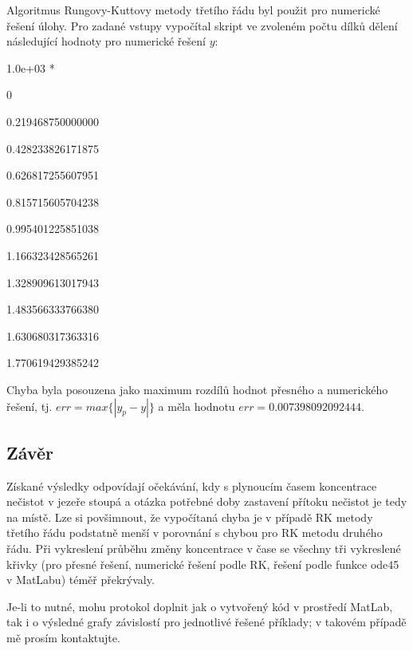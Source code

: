\documentclass[a4paper,12pt]{article}
\begin{document}
   Algoritmus Rungovy-Kuttovy metody třetího řádu byl použit pro numerické řešení úlohy. Pro zadané vstupy vypočítal skript ve zvoleném počtu dílků dělení následující hodnoty pro numerické řešení $y$:\bigskip
   
   1.0e+03 *\par

                   0\par
   0.219468750000000\par
   0.428233826171875\par
   0.626817255607951\par
   0.815715605704238\par
   0.995401225851038\par
   1.166323428565261\par
   1.328909613017943\par
   1.483566333766380\par
   1.630680317363316\par
   1.770619429385242\par
   
    Chyba byla posouzena jako maximum rozdílů hodnot přesného a numerického řešení, tj. $err=max\{\left|y_p-y\right|\}$ a měla hodnotu $err=0.007398092092444$.
    
    \subsection*{Závěr}
    Získané výsledky odpovídají očekávání, kdy s plynoucím časem koncentrace nečistot v jezeře stoupá a otázka potřebné doby zastavení přítoku nečistot je tedy na místě. Lze si povšimnout, že vypočítaná chyba je v případě RK metody třetího řádu podstatně menší v porovnání s chybou pro RK metodu druhého řádu. Při vykreslení průběhu změny koncentrace v čase se všechny tři vykreslené křivky (pro přesné řešení, numerické řešení podle RK, řešení podle funkce ode45 v MatLabu) téměř překrývaly.\par
Je-li to nutné, mohu protokol doplnit jak o vytvořený kód v prostředí MatLab, tak i o výsledné grafy závislostí pro jednotlivé řešené příklady; v takovém případě mě prosím kontaktujte.
    
\end{document}
